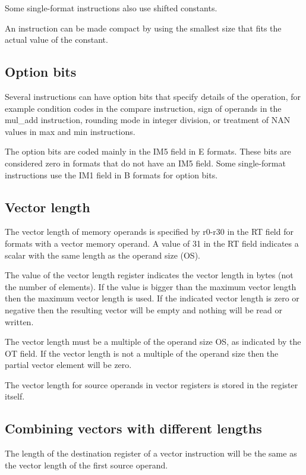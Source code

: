 \documentclass[forwardcom.tex]{subfiles}
\begin{document}
Some single-format instructions also use shifted constants.
\vv

An instruction can be made compact by using the smallest size that fits the actual value of the constant.
\vv

\subsection{Option bits}
Several instructions can have option bits that specify details of the operation, for example condition codes in the compare instruction, sign of operands in the mul\_add instruction, rounding mode in integer division, or treatment of NAN values in max and min instructions.
\vv

The option bits are coded mainly in the IM5 field in E formats. These bits are considered zero in formats that do not have an IM5 field. 
Some single-format instructions use the IM1 field in B formats for option bits. 
\vv

\subsection{Vector length}
The vector length of memory operands is specified by r0-r30 in the RT field for formats with a vector memory operand. A value of 31 in the RT field indicates a scalar with the same length as the operand size (OS).
\vv

The value of the vector length register indicates the vector length in bytes (not the number of elements). If the value is bigger than the maximum vector length then the maximum vector length is used. 
If the indicated vector length is zero or negative then the resulting vector will be empty and nothing will be read or written.
\vv

The vector length must be a multiple of the operand size OS, as indicated by the OT field. If the vector length is not a multiple of the operand size then the partial vector element will be zero.
\vv

The vector length for source operands in vector registers is stored in the register itself.
\vv

\subsection{Combining vectors with different lengths}
The length of the destination register of a vector instruction will be the same as the vector length of the first source operand.
\vv
\end{document}
